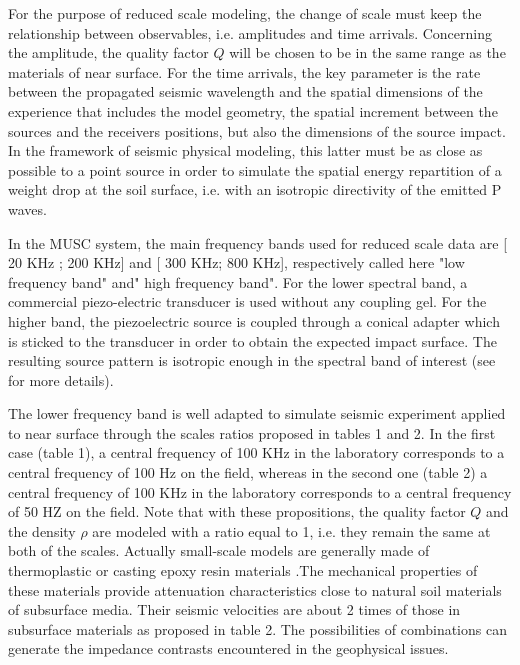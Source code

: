 \documentclass[manuscript,revised]{geophysics}
\begin{document}
\noindent For the purpose of reduced scale modeling, the change of scale must keep the relationship between observables, i.e. amplitudes and time arrivals. Concerning the amplitude, the quality factor $Q$ will be chosen to be in the same range as the materials of near surface. For the time arrivals, the key parameter is the rate between the propagated seismic wavelength and the spatial dimensions of the experience that includes the model geometry, the spatial increment between the sources and the receivers positions, but also the dimensions of the source impact. In the framework of seismic physical modeling, this latter must be as close as possible to a point source in order to simulate the spatial energy repartition of a weight drop at the soil surface, i.e. with an isotropic directivity of the emitted P waves.

\noindent In the MUSC system, the main frequency bands used for reduced scale data are [ 20 KHz ; 200 KHz] and [ 300 KHz; 800 KHz], respectively called here "low frequency band" and" high frequency band". For the lower spectral band, a commercial piezo-electric transducer is used without any coupling gel. For the higher band, the piezoelectric source is coupled through a conical adapter which is sticked to the transducer in order to obtain the expected impact surface. The resulting source pattern is isotropic enough in the spectral band of interest (see \citep{Bretaudeau_SSM_2011} for more details).

\noindent The lower frequency band is well adapted to simulate seismic experiment applied to near surface through the scales ratios proposed in tables 1 and 2. In the first case (table 1), a central frequency of 100 KHz in the laboratory corresponds to a central frequency of 100 Hz on the field, whereas in the second one (table 2) a central frequency of 100 KHz in the laboratory corresponds to a central frequency of 50 HZ on the field. Note that with these propositions, the  quality factor $Q$ and the density $\rho$ are modeled with a ratio equal to 1, i.e. they remain the same at both of the scales. Actually small-scale models are generally made of thermoplastic or casting epoxy resin materials \citep{Bretaudeau_FWI_2013,Bretaudeau_SSM_2011,Bretaudeau_SSA_2008b}.The mechanical properties of these materials provide attenuation characteristics close to natural soil materials of subsurface media. Their seismic velocities are about 2 times of those in subsurface materials as proposed in table 2. The possibilities of combinations can generate the impedance contrasts encountered in the geophysical issues. 
\end{document}

